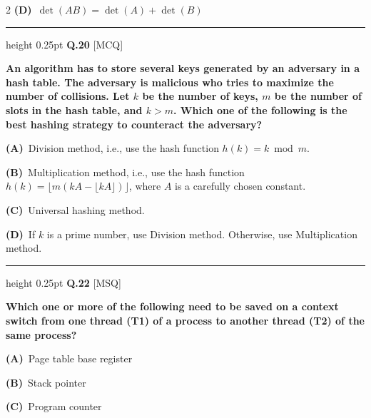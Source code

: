 \documentclass[a4paper,10pt,twoside]{article}
\begin{document}
\begin{multicols}{2}
\textbf{(D)}~$\det(AB) = \det(A) + \det(B)$
\par\vspace{6pt}\hrule height 0.25pt\vspace{6pt}
\noindent\textbf{Q.20} \hfill {\footnotesize\textsf{[MCQ]}}
\par\vspace{2pt}
{\bfseries An algorithm has to store several keys generated by an adversary in a hash table. The adversary is malicious who tries to maximize the number of collisions. Let $k$ be the number of keys, $m$ be the number of slots in the hash table, and $k > m$.
Which one of the following is the best hashing strategy to counteract the adversary? \par}
\par\vspace{2pt}\noindent
\textbf{(A)}~Division method, i.e., use the hash function $h(k) = k \bmod m$.\par\vspace{2pt}\noindent
\textbf{(B)}~Multiplication method, i.e., use the hash function $h(k) = \lfloor m(kA - \lfloor kA \rfloor)\rfloor$, where $A$ is a carefully chosen constant.\par\vspace{2pt}\noindent
\textbf{(C)}~Universal hashing method.\par\vspace{2pt}\noindent
\textbf{(D)}~If $k$ is a prime number, use Division method. Otherwise, use Multiplication method.
\par\vspace{6pt}\hrule height 0.25pt\vspace{6pt}
\noindent\textbf{Q.22} \hfill {\footnotesize\textsf{[MSQ]}}
\par\vspace{2pt}
{\bfseries Which one or more of the following need to be saved on a context switch from one thread (T1) of a process to another thread (T2) of the same process? \par}
\par\vspace{2pt}\noindent
\textbf{(A)}~Page table base register\par\vspace{2pt}\noindent
\textbf{(B)}~Stack pointer\par\vspace{2pt}\noindent
\textbf{(C)}~Program counter\par\vspace{2pt}\noindent

\end{multicols}
\end{document}
